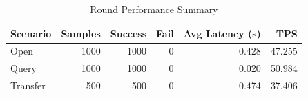 \begin{table}
\caption{Round Performance Summary}
\label{tab:round_perf}
\begin{tabular}{lrrrrr}
\toprule
Scenario & Samples & Success & Fail & Avg Latency (s) & TPS \\
\midrule
Open & 1000 & 1000 & 0 & 0.428 & 47.255 \\
Query & 1000 & 1000 & 0 & 0.020 & 50.984 \\
Transfer & 500 & 500 & 0 & 0.474 & 37.406 \\
\bottomrule
\end{tabular}
\end{table}
